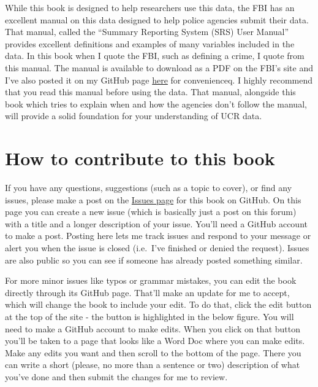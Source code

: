 \documentclass[
  12pt,
  openany]{book}
\begin{document}
While this book is designed to help researchers use this data, the FBI has an excellent manual on this data designed to help police agencies submit their data. That manual, called the ``Summary Reporting System (SRS) User Manual'' provides excellent definitions and examples of many variables included in the data. In this book when I quote the FBI, such as defining a crime, I quote from this manual. The manual is available to download as a PDF on the FBI's site and I've also posted it on my GitHub page \href{https://github.com/jacobkap/ucrbook/blob/main/FBI\%20Uniform\%20Crime\%20Reporting\%20(UCR)\%20Program\%20User\%20Manual.pdf}{here} for convenienceq. I highly recommend that you read this manual before using the data. That manual, alongside this book which tries to explain when and how the agencies don't follow the manual, will provide a solid foundation for your understanding of UCR data.

\section{How to contribute to this book}\label{how-to-contribute-to-this-book}

If you have any questions, suggestions (such as a topic to cover), or find any issues, please make a post on the \href{https://github.com/jacobkap/ucrbook/issues}{Issues page} for this book on GitHub. On this page you can create a new issue (which is basically just a post on this forum) with a title and a longer description of your issue. You'll need a GitHub account to make a post. Posting here lets me track issues and respond to your message or alert you when the issue is closed (i.e.~I've finished or denied the request). Issues are also public so you can see if someone has already posted something similar.

For more minor issues like typos or grammar mistakes, you can edit the book directly through its GitHub page. That'll make an update for me to accept, which will change the book to include your edit. To do that, click the edit button at the top of the site - the button is highlighted in the below figure. You will need to make a GitHub account to make edits. When you click on that button you'll be taken to a page that looks like a Word Doc where you can make edits. Make any edits you want and then scroll to the bottom of the page. There you can write a short (please, no more than a sentence or two) description of what you've done and then submit the changes for me to review.
\end{document}

